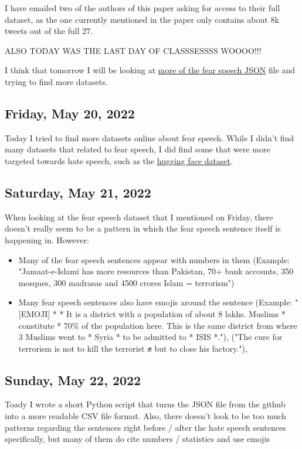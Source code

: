 \documentclass[11pt,letterpaper]{article}
\begin{document}
I have emailed two of the authors of this paper asking for access to their full dataset, as the one currently mentioned in the paper only contains about 8k tweets out of the full 27.

ALSO TODAY WAS THE LAST DAY OF CLASSSESSSS WOOOO!!! 

I think that tomorrow I will be looking at \href{https://raw.githubusercontent.com/hate-alert/Fear-speech-analysis/master/Data/fear_speech_data.json}{more of the fear speech JSON} file and trying to find more datasets.

\subsection{Friday, May 20, 2022}
Today I tried to find more datasets online about fear speech. While I didn't find many datasets that related to fear speech, I did find some that were more targeted towards hate speech, such as the \href{https://huggingface.co/datasets/hate_speech_offensive}{hugging face dataset}.

\subsection{Saturday, May 21, 2022}
When looking at the fear speech dataset that I mentioned on Friday, there doesn't really seem to be a pattern in which the fear speech sentence itself is happening in. However:
\begin{itemize}
    \item Many of the fear speech sentences appear with numbers in them (Example: "Jamaat-e-Islami has more resources than Pakistan, 70+ bank accounts, 350 mosques, 300 madrasas and 4500 crores Islam = terrorism")
    \item Many fear speech sentences also have emojis around the sentence (Example: "[EMOJI]  * * It is a district with a population of about 8 lakhs. Muslims * constitute * 70\% of the population here. This is the same district from where 3 Muslims went to * Syria * to be admitted to * ISIS *."), ("The cure for terrorism is not to kill the terrorist ✊  but to close his factory."),
\end{itemize}

\subsection{Sunday, May 22, 2022}
Toady I wrote a short Python script that turns the JSON file from the github into a more readable CSV file format. Also, there doesn't look to be too much patterns regarding the sentences right before / after the hate speech sentences specifically, but many of them do cite numbers / statistics and use emojis
\end{document}
